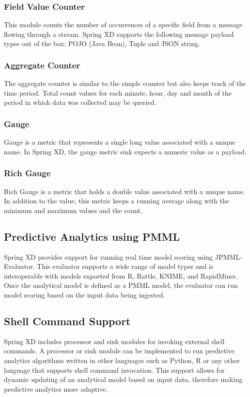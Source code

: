 \subsubsection {Field Value Counter}

This module counts the number of occurrences of a specific field from a message
flowing through a stream. Spring XD supports the following message payload types
out of the box: POJO (Java Bean), Tuple and JSON string.

\subsubsection {Aggregate Counter}

The aggregate counter is similar to the simple counter but also keeps track of
the time period. Total count values for each minute, hour, day and month
of the period in which data was collected may be queried.

\subsubsection {Gauge}
Gauge is a metric that represents a single long value associated with a unique name.
In Spring XD, the gauge metric sink expects a numeric value as a payload.

\subsubsection {Rich Gauge}
Rich Gauge is a metric that holds a double value associated with a unique name. In
addition to the value, this metric keeps a running average along with the minimum and
maximum values and the count.

\subsection {Predictive Analytics using PMML}
Spring XD provides support for running real time model scoring using JPMML-Evaluator.
This evaluator supports a wide range of model types and is interoperable with
models exported from R, Rattle, KNIME, and RapidMiner. Once the analytical model
is defined as a PMML model, the evaluator can run model scoring based on the 
input data being ingested.

\subsection {Shell Command Support}
Spring XD includes processor and sink modules for invoking external shell commands.
A processor or sink module can be implemented to run predictive
analytics algorithms written in other languages such as Python, R or any other language that
supports shell command invocation. This support allows for dynamic updating of
an analytical model based on input data, therefore making predictive analytics more adaptive.

